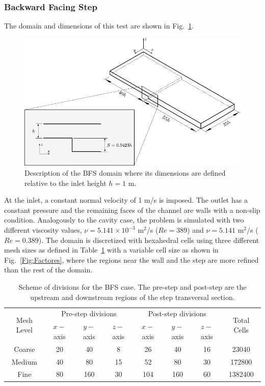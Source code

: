 \documentclass[final,3p,times,11pt,onecolumn]{myElsarticle}
\numberwithin{equation}{section}
\begin{document}
\subsubsection{Backward Facing Step}
The domain and dimensions of this test are shown in Fig.~\ref{Fig:Geometria3}.
\begin{figure}[t!!!]
\centering
\includegraphics[width=12cm]{fig/Cases/Geometria3.pdf}
\caption{Description of the BFS domain where its dimensions are defined relative to the inlet height $h = 1$ m.}
\label{Fig:Geometria3}
\end{figure}
At the inlet, a constant normal velocity of 1 m/s is imposed. The outlet has a constant pressure and the remaining faces of the channel are walls with a non-slip condition. Analogously to the cavity case, the problem is simulated with two different viscosity values, $\nu = 5.141 \times 10^{-3}$ m$^2$/s ($Re=389$) and $\nu = 5.141$ m$^2$/s ($Re=0.389$). The domain is discretized with hexahedral cells using three different mesh sizes as defined in Table~\ref{Table:BFSMeshes} with a variable cell size as shown in Fig.~\ref{Fig:Factores}, where the regions near the wall and the step are more refined than the rest of the domain.
\begin{table}[b!!!!!!]
\centering
\begin{tabular}{cccccccc}
\hline 
\multirow{2}{1cm}{Mesh Level} & \multicolumn{3}{c}{Pre-step divisions} & \multicolumn{3}{c}{Post-step divisions} & \multirow{2}{1cm}{Total Cells} \\ 
\cline{2-7} 
&  $x-$axis &  $y-$axis &  $z-$axis &  $x-$axis &  $y-$axis &  $z-$axis \\ 
\hline 
Coarse & 20 & 40 & 8 & 26 & 40 & 16 & 23040 \\ 
Medium & 40 & 80 & 15 & 52 & 80 & 30 & 172800 \\ 
Fine & 80 & 160 & 30 & 104 & 160 & 60 & 1382400 \\ 
\hline 
\end{tabular}
\caption{Scheme of divisions for the BFS case. The pre-step and post-step are the upstream and downstream regions of the step transversal section.}
\label{Table:BFSMeshes}
\end{table}
\end{document}
